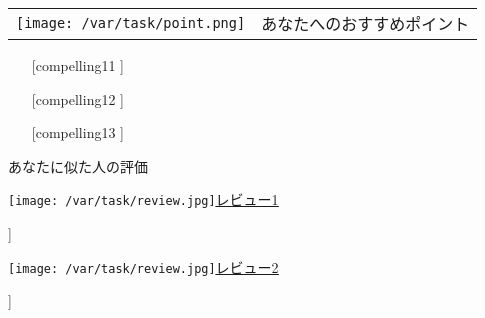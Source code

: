 \documentclass[lualatex,paper=a4,airticle]{jlreq}
\begin{document}
\begin{minipage}[t][0.43\textheight][t]{\textwidth}
\begin{multicols}{2}
\hspace{-2.3cm} %
  \begin{minipage}{1.25\columnwidth}
  \vspace{-0.4cm}
  \begin{itembox}[l]{
  \begin{tabular}{@{}m{9mm}@{}m{6cm}}
    \texttt{[image: /var/task/point.png]} & \gtfamily\ebseries\large あなたへのおすすめポイント
  \end{tabular}
}
   \vspace{-1\baselineskip}
\begin{itemize}
\setlength{\itemindent}{-10pt}
\item [[compelling11]]
\item [[compelling12]]
\item [[compelling13]]
\end{itemize}
\end{itembox}
  \end{minipage}


\hspace{-2.3cm} %
  \begin{minipage}{1.25\columnwidth}
  \begin{itembox}[l]{{\gtfamily\ebseries\large あなたに似た人の評価}}

  \vspace{-3mm}
\texttt{[image: /var/task/review.jpg]}\href{[[review_url11]]}{\color{blue}\underline{レビュー1}}\par
[[review11]]\par
\texttt{[image: /var/task/review.jpg]}\href{[[review_url12]]}{\color{blue}\underline{レビュー2}}\par
[[review12]]\par
\end{itembox}
  \end{minipage}

\end{multicols}
\end{minipage}
\end{document}
